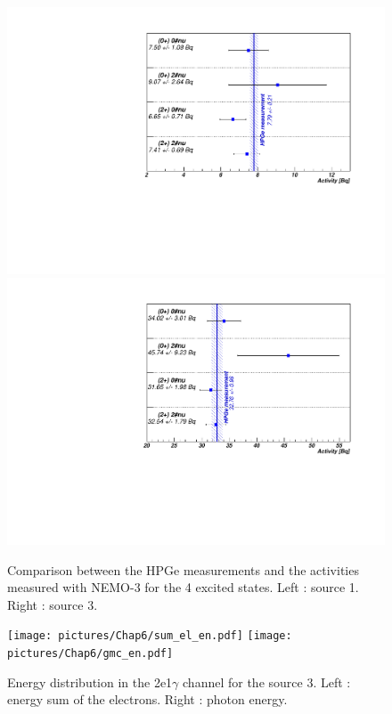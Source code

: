 \documentclass[main.tex]{subfiles}
\begin{document}
\begin{figure} [h!]
\begin{center}
\includegraphics[scale=0.4]{pictures/Chap6/ComparisonChannelSource1AllES.pdf}
\includegraphics[scale=0.4]{pictures/Chap6/ComparisonChannelSource3AllES.pdf}
\end{center}
\caption{Comparison between the HPGe measurements and the activities measured with NEMO-3 for the 4 excited states. Left : source 1. Right : source 3.}
\label{plot:ComparisionSourcesHPGe}
\end{figure}



\begin{figure} [h!]
\begin{center}
\texttt{[image: pictures/Chap6/sum\_el\_en.pdf]}
\texttt{[image: pictures/Chap6/gmc\_en.pdf]}
\end{center}
\caption{Energy distribution in the 2e1$\gamma$ channel for the source 3. Left : energy sum of the electrons. Right : photon energy.}
\label{plot:DistributionEnergy2nu2Systematics}
\end{figure}
\end{document}

